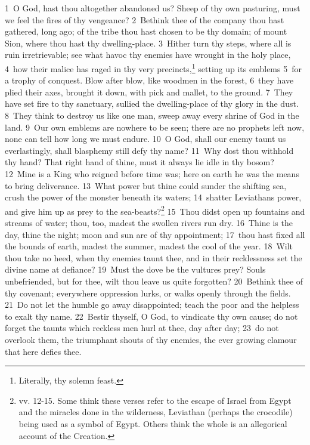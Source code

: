 \documentclass[10pt]{book} %
\begin{document}
\textcolor{benred8}{1}~O God, hast thou altogether abandoned us? Sheep of thy own pasturing, must we feel the fires of thy vengeance? \textcolor{benred8}{2}~Bethink thee of the company thou hast gathered, long ago; of the tribe thou hast chosen to be thy domain; of mount Sion, where thou hast thy dwelling-place. \textcolor{benred8}{3}~Hither turn thy steps, where all is ruin irretrievable; see what havoc thy enemies have wrought in the holy place, \textcolor{benred8}{4}~how their malice has raged in thy very precincts,\footnote[1]{Literally, \textasciigrave thy solemn feast\textquotesingle .} setting up its emblems \textcolor{benred8}{5}~for a trophy of conquest. Blow after blow, like woodmen in the forest, \textcolor{benred8}{6}~they have plied their axes, brought it down, with pick and mallet, to the ground. \textcolor{benred8}{7}~They have set fire to thy sanctuary, sullied the dwelling-place of thy glory in the dust. \textcolor{benred8}{8}~They think to destroy us like one man, sweep away every shrine of God in the land. \textcolor{benred8}{9}~Our own emblems are nowhere to be seen; there are no prophets left now, none can tell how long we must endure. \textcolor{benred8}{10}~O God, shall our enemy taunt us everlastingly, shall blasphemy still defy thy name? \textcolor{benred8}{11}~Why dost thou withhold thy hand? That right hand of thine, must it always lie idle in thy bosom?
\textcolor{benred8}{12}~Mine is a King who reigned before time was; here on earth he was the means to bring deliverance. \textcolor{benred8}{13}~What power but thine could sunder the shifting sea, crush the power of the monster beneath its waters; \textcolor{benred8}{14}~shatter Leviathan\textquotesingle s power, and give him up as prey to the sea-beasts?\footnote[2]{vv. 12-15. Some think these verses refer to the escape of Israel from Egypt and the miracles done in the wilderness, Leviathan (perhaps the crocodile) being used as a symbol of Egypt. Others think the whole is an allegorical account of the Creation.} \textcolor{benred8}{15}~Thou didst open up fountains and streams of water; thou, too, madest the swollen rivers run dry. \textcolor{benred8}{16}~Thine is the day, thine the night; moon and sun are of thy appointment; \textcolor{benred8}{17}~thou hast fixed all the bounds of earth, madest the summer, madest the cool of the year.
\textcolor{benred8}{18}~Wilt thou take no heed, when thy enemies taunt thee, and in their recklessness set the divine name at defiance? \textcolor{benred8}{19}~Must the dove be the vulture\textquotesingle s prey? Souls unbefriended, but for thee, wilt thou leave us quite forgotten? \textcolor{benred8}{20}~Bethink thee of thy covenant; everywhere oppression lurks, or walks openly through the fields. \textcolor{benred8}{21}~Do not let the humble go away disappointed; teach the poor and the helpless to exalt thy name. \textcolor{benred8}{22}~Bestir thyself, O God, to vindicate thy own cause; do not forget the taunts which reckless men hurl at thee, day after day; \textcolor{benred8}{23}~do not overlook them, the triumphant shouts of thy enemies, the ever growing clamour that here defies thee.
\end{document}
